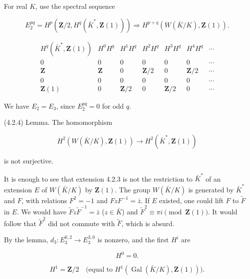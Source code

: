 \documentclass[9pt,twoside]{extarticle}
\begin{document}
{For real \(K\), use the spectral sequence\par

\[
E_2^{pq}=H^p(\mathbf Z/2,H^q(\bar K^*,\mathbf Z(1)))\Rightarrow H^{p+q}(W(\bar K/K),\mathbf Z(1)).
\]

\[
\begin{array}{c|cccccc}
H^q(\bar K^*,\mathbf Z(1)) & H^0H^q & H^1H^q & H^2H^q & H^3H^q & H^4H^q & \cdots\\ \hline
0            & 0         & 0           & 0           & 0           & 0           & \cdots\\
\mathbf Z    & \mathbf Z & 0           & \mathbf Z/2 & 0           & \mathbf Z/2 & \cdots\\
0            & 0         & 0           & 0           & 0           & 0           & \cdots\\
\mathbf Z(1) & 0         & \mathbf Z/2 & 0           & \mathbf Z/2 & 0           & \cdots
\end{array}
\]

We have \(E_2=E_3\), since \(E_2^{pq}=0\) for odd \(q\).\par

(4.2.4) Lemma. The homomorphism\par

\[
H^2(W(\bar K/K),\mathbf Z(1))\longrightarrow H^2(\bar K^*,\mathbf Z(1))
\]

is not surjective.\par

It is enough to see that extension 4.2.3 is not the restriction to \(\bar K^*\) of an extension \(E\) of \(W(\bar K/K)\) by \(\mathbf Z(1)\). The group \(W(\bar K/K)\) is generated by \(\bar K^*\) and \(F\), with relations \(F^2=-1\) and \(FzF^{-1}=\bar z\). If \(E\) existed, one could lift \(F\) to \(\widetilde F\) in \(E\). We would have \(\widetilde Fz\widetilde F^{-1}=\bar z\) (\(z\in\bar K\)) and \(\widetilde F^2\equiv\pi i\pmod{\mathbf Z(1)}\). It would follow that \(\widetilde F^2\) did not commute with \(\widetilde F\), which is absurd.\par

By the lemma, \(d_3:E_3^{0,2}\to E_3^{3,0}\) is nonzero, and the first \(H^i\) are\par

\[
H^0=0.
\]

\[
H^1=\mathbf Z/2\quad\text{(equal to }H^1(\operatorname{Gal}(\bar K/K),\mathbf Z(1))\text{)}.
\]
}
\end{document}
